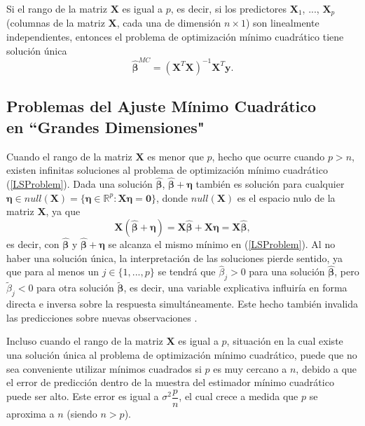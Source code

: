 \documentclass[a4paper,12pt]{article}
\begin{document}
Si el rango de la matriz $\boldsymbol{X}$ es igual a $p$, es decir, si los predictores $\boldsymbol{X}_1$, ..., $\boldsymbol{X}_p$ (columnas de la matriz $\boldsymbol{X}$, cada una de dimensión $n \times 1$) son linealmente independientes, entonces el problema de optimización mínimo cuadrático tiene solución única 
\begin{equation}
\label{BetaMC}
\boldsymbol{\hat{\beta}}^{MC}=(\boldsymbol{X}^T\boldsymbol{X})^{-1}\boldsymbol{X}^T\boldsymbol{y}.
\end{equation}

\subsection*{Problemas del Ajuste Mínimo Cuadrático \\ en ``Grandes Dimensiones"}
Cuando el rango de la matriz $\boldsymbol{X}$ es menor que $p$, hecho que ocurre cuando $p > n$, existen infinitas soluciones al problema de optimización mínimo cuadrático (\ref{LSProblem}). Dada una solución $\boldsymbol{\hat{\beta}}$, $\boldsymbol{\hat{\beta}} + \boldsymbol{\eta}$ también es solución para cualquier $\boldsymbol{\eta} \in null(\boldsymbol{X})=\{\boldsymbol{\eta} \in \mathbb{R}^p: \boldsymbol{X}\boldsymbol{\eta}=\boldsymbol{0}\}$, donde $null(\boldsymbol{X})$ es el espacio nulo de la matriz $\boldsymbol{X}$, ya que 
\begin{equation}
\boldsymbol{X}(\boldsymbol{\hat{\beta}} + \boldsymbol{\eta})=\boldsymbol{X}\boldsymbol{\hat{\beta}}+ \boldsymbol{X}\boldsymbol{\eta}=\boldsymbol{X}\boldsymbol{\hat{\beta}},
\end{equation}
es decir, con $\boldsymbol{\hat{\beta}}$ y $\boldsymbol{\hat{\beta}} + \boldsymbol{\eta}$ se alcanza el mismo mínimo en (\ref{LSProblem}). Al no haber una solución única, la interpretación de las soluciones pierde sentido, ya que para al menos un $j\in \{1,...,p\}$ se tendrá que $\hat{\beta}_j>0$ para una solución $\boldsymbol{\hat{\beta}}$, pero $\tilde{\beta}_j<0$ para otra solución $\boldsymbol{\tilde{\beta}}$, es decir, una variable explicativa influiría en forma directa e inversa sobre la respuesta simultáneamente. Este hecho también invalida las predicciones sobre nuevas observaciones \citep{hastie2015statistical}.

Incluso cuando el rango de la matriz $\boldsymbol{X}$ es igual a $p$, situación en la cual existe una solución única al problema de optimización mínimo cuadrático, puede que no sea conveniente utilizar mínimos cuadrados si $p$ es muy cercano a $n$, debido a que el error de predicción dentro de la muestra del estimador mínimo cuadrático puede ser alto. Este error es igual a $\sigma^2 \dfrac{p}{n}$, el cual crece a medida que $p$ se aproxima a $n$ (siendo $n > p$).
\end{document}
